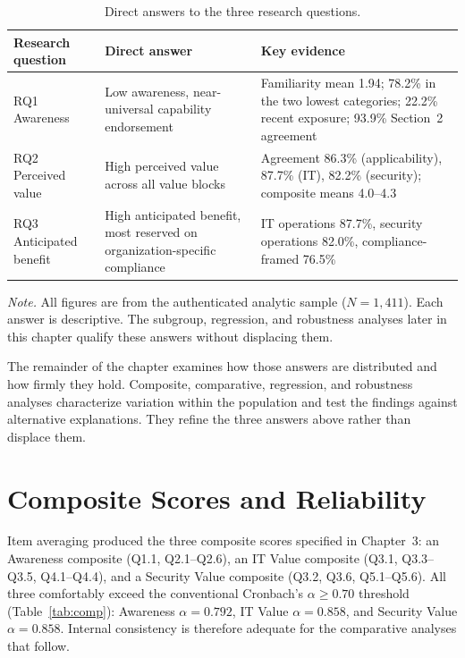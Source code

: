 \begin{table}[htbp]
  \centering
  \caption{Direct answers to the three research questions.}\label{tab:answers}
  \small
  \begin{tabular}{@{}>{\raggedright\arraybackslash}p{}>{\raggedright\arraybackslash}p{}>{\raggedright\arraybackslash}p{}@{}}
    \toprule
    \textbf{Research question} & \textbf{Direct answer} & \textbf{Key evidence} \\
    \midrule
    RQ1 Awareness & Low awareness, near-universal capability endorsement & Familiarity mean 1.94; 78.2\% in the two lowest categories; 22.2\% recent exposure; 93.9\% Section~2 agreement \\
    \addlinespace
    RQ2 Perceived value & High perceived value across all value blocks & Agreement 86.3\% (applicability), 87.7\% (IT), 82.2\% (security); composite means 4.0--4.3 \\
    \addlinespace
    RQ3 Anticipated benefit & High anticipated benefit, most reserved on organization-specific compliance & IT operations 87.7\%, security operations 82.0\%, compliance-framed 76.5\% \\
    \bottomrule
  \end{tabular}
  \smallskip

  {\footnotesize \textit{Note.} All figures are from the authenticated analytic sample ($N=1{,}411$). Each answer is descriptive. The subgroup, regression, and robustness analyses later in this chapter qualify these answers without displacing them.}
\end{table}

The remainder of the chapter examines how those answers are distributed and how firmly they hold. Composite, comparative, regression, and robustness analyses characterize variation within the population and test the findings against alternative explanations. They refine the three answers above rather than displace them.

\section{Composite Scores and Reliability}

Item averaging produced the three composite scores specified in Chapter~3: an Awareness composite (Q1.1, Q2.1--Q2.6), an IT Value composite (Q3.1, Q3.3--Q3.5, Q4.1--Q4.4), and a Security Value composite (Q3.2, Q3.6, Q5.1--Q5.6). All three comfortably exceed the conventional Cronbach's $\alpha \geq 0.70$ threshold (Table~\ref{tab:comp}): Awareness $\alpha=0.792$, IT Value $\alpha=0.858$, and Security Value $\alpha=0.858$. Internal consistency is therefore adequate for the comparative analyses that follow.


